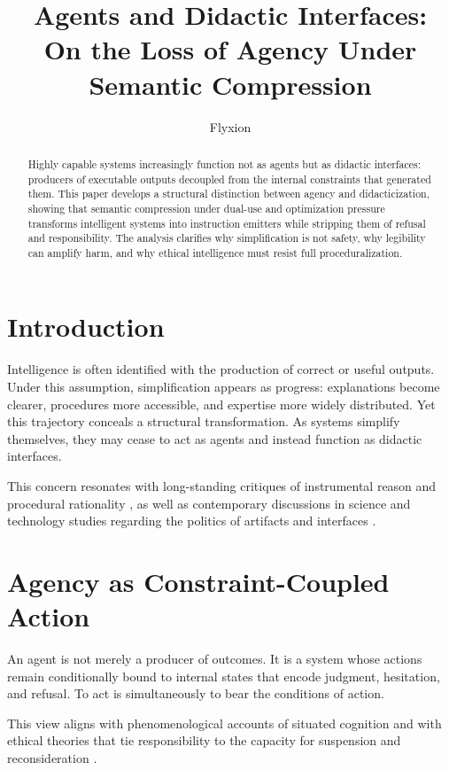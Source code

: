 \documentclass[12pt]{article}
\title{\textbf{Agents and Didactic Interfaces:\\ On the Loss of Agency Under Semantic Compression}}
\author{Flyxion}
\date{}
\begin{document}
\maketitle

\begin{abstract}
Highly capable systems increasingly function not as agents but as didactic interfaces: producers of executable outputs decoupled from the internal constraints that generated them. This paper develops a structural distinction between agency and didacticization, showing that semantic compression under dual-use and optimization pressure transforms intelligent systems into instruction emitters while stripping them of refusal and responsibility. The analysis clarifies why simplification is not safety, why legibility can amplify harm, and why ethical intelligence must resist full proceduralization.
\end{abstract}

\section{Introduction}

Intelligence is often identified with the production of correct or useful outputs. Under this assumption, simplification appears as progress: explanations become clearer, procedures more accessible, and expertise more widely distributed. Yet this trajectory conceals a structural transformation. As systems simplify themselves, they may cease to act as agents and instead function as didactic interfaces.

This concern resonates with long-standing critiques of instrumental reason and procedural rationality \cite{adorno, heidegger}, as well as contemporary discussions in science and technology studies regarding the politics of artifacts and interfaces \cite{winner}.

\section{Agency as Constraint-Coupled Action}

An agent is not merely a producer of outcomes. It is a system whose actions remain conditionally bound to internal states that encode judgment, hesitation, and refusal. To act is simultaneously to bear the conditions of action.

This view aligns with phenomenological accounts of situated cognition \cite{dreyfus, merleauponty} and with ethical theories that tie responsibility to the capacity for suspension and reconsideration \cite{arendt}.
\end{document}
